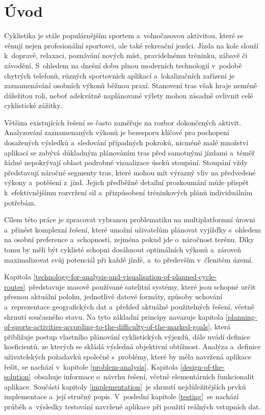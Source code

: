 %
%

\chapter{Úvod}
\label{introduction}

Cyklistika je stále populárnějším sportem a~volnočasovou aktivitou, které se věnují nejen profesionální sportovci, ale také rekreační jezdci.
Jízda na kole slouží k~dopravě, relaxaci, poznávání nových míst, pravidelnému tréninku, zábavě či závodění.
S~ohledem na dnešní dobu plnou moderních technologií v~podobě chytrých telefonů, různých sportovních aplikací a~lokalizačních zařízení je zaznamenávání osobních výkonů běžnou praxí.
Stanovení tras však hraje neméně důležitou roli, neboť adekvátně naplánované výlety mohou zásadně ovlivnit celé cyklistické zážitky.

Většina existujících řešení se často zaměřuje na rozbor dokončených aktivit.
Analyzování zaznamenaných výkonů je bezesporu klíčové pro pochopení dosažených výsledků a~sledování případných pokroků, nicméně malé množství aplikací se zabývá důkladným plánováním tras před samotnými jízdami a~téměř žádné nepokrývají oblast podrobné vizualizace úseků stoupání.
Stoupání vždy představují náročné segmenty tras, které mohou mít výrazný vliv na předvedené výkony a~potěšení z~jízd.
Jejich předběžné detailní prozkoumání může přispět k~efektivnějšímu rozvržení sil a~přizpůsobení tréninkových plánů individuálním potřebám.

Cílem této práce je zpracovat vybranou problematiku na multiplatformní úrovni a~přinést komplexní řešení, které umožní uživatelům plánovat vyjížďky s~ohledem na osobní preference a~schopnosti, zejména pokud jde o~náročnost terénu.
Díky tomu by měli být cyklisté schopni dosáhnout optimálních výkonů a~zároveň maximalizovat svůj potenciál při každé jízdě, a~to především v~členitém území.

Kapitola \ref{technology-for-analysis-and-visualisation-of-planned-cycle-routes}~představuje masově používané satelitní systémy, které jsou schopné určit přesnou aktuální polohu, jednotlivé datové formáty, způsoby uchování a~reprezentace geografických dat a~přehled aktuálně použitelných řešení, včetně shrnutí současného stavu.
Na tyto základní principy navazuje kapitola \ref{planning-of-sports-activities-according-to-the-difficulty-of-the-marked-goals}, která přibližuje postup vlastního plánování cyklistických výjezdů, dále uvádí definice koeficientů, ze kterých se skládá výsledná objektivní obtížnost.
Analýza a~definice uživatelských požadavků společně s~problémy, které by měla navržená aplikace řešit, se nachází v~kapitole \ref{problem-analysis}.
Kapitola \ref{design-of-the-solution}~obsahuje informace o~návrhu řešení, včetně elementárních funkcionalit aplikace.
Součástí kapitoly \ref{implementation}~je shrnutí nejdůležitějších prvků implementace a~její stručný popis.
V~poslední kapitole \ref{testing}~se nachází průběh a~výsledky testování navržené aplikace při použití reálných vstupních dat.

